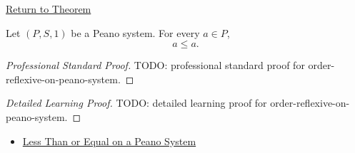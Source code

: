 \newpage
{}
\label{prf:order-reflexive-on-peano-system}

\begin{remark*}[Return]
\hyperref[thm:order-reflexive-on-peano-system]{Return to Theorem}
\end{remark*}

\begin{theorem*}
Let $(P,S,1)$ be a Peano system. For every $a \in P$,
\[
a \le a.
\]
\end{theorem*}

\begin{proof}[Professional Standard Proof]
\LRAProofBodyStart
TODO: professional standard proof for order-reflexive-on-peano-system.
\end{proof}

\begin{proof}[Detailed Learning Proof]
\LRAProofBodyStart
TODO: detailed learning proof for order-reflexive-on-peano-system.
\end{proof}

\begin{remark*}
\end{remark*}

\begin{dependencies}
\begin{itemize}
  \item \hyperref[def:less-than-or-equal-on-peano-system]{Less Than or Equal on a Peano System}
\end{itemize}
\end{dependencies}

\clearpage

